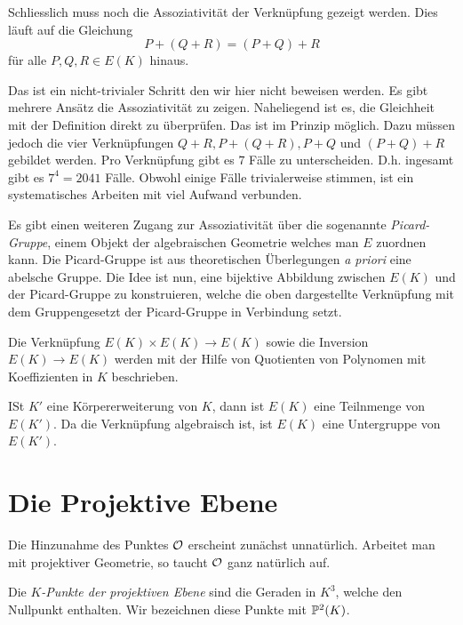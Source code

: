 Schliesslich muss noch die Assoziativität der Verknüpfung gezeigt
werden. Dies läuft auf die Gleichung
$$
P + (Q + R) = (P+Q)+R$$
für alle $P,Q,R\in E(K)$ hinaus.

Das ist ein nicht-trivialer Schritt den wir hier nicht beweisen
werden. Es gibt mehrere Ansätz die Assoziativität zu zeigen.
Naheliegend ist es, die Gleichheit mit der Definition direkt zu
überprüfen. Das ist im Prinzip möglich. Dazu müssen jedoch die vier
Verknüpfungen $Q+R, P+(Q+R), P+Q$ und $(P+Q)+R$ gebildet werden.
Pro Verknüpfung gibt es $7$ Fälle zu unterscheiden. D.h. ingesamt gibt
es $7^4= 2041$ Fälle. Obwohl einige Fälle trivialerweise stimmen, ist
ein systematisches Arbeiten mit viel Aufwand verbunden.


Es gibt einen weiteren Zugang zur Assoziativität über die sogenannte
 \emph{Picard-Gruppe}, einem  Objekt der algebraischen Geometrie
welches man $E$ zuordnen kann. Die Picard-Gruppe ist aus theoretischen
Überlegungen \textit{a priori} eine abelsche Gruppe. Die Idee ist nun, eine
bijektive Abbildung zwischen $E(K)$ und der Picard-Gruppe zu
konstruieren, welche die oben dargestellte Verknüpfung mit dem
Gruppengesetzt der Picard-Gruppe in Verbindung setzt.


\begin{bemerkung}
  Die Verknüpfung $E(K)\times
  E(K)\rightarrow E(K)$ sowie die Inversion $E(K)\rightarrow E(K)$
  werden mit der Hilfe von 
  Quotienten von Polynomen mit Koeffizienten in $K$ beschrieben.

  ISt $K'$ eine Körpererweiterung von $K$, dann ist $E(K)$ eine
  Teilnmenge von $E(K')$. Da die Verknüpfung algebraisch ist, ist
  $E(K)$ eine Untergruppe von $E(K')$.
\end{bemerkung}

\section{Die Projektive Ebene}
\label{sec:projektiv}

Die Hinzunahme des Punktes ${\mathcal O}$ erscheint zunächst unnatürlich.
Arbeitet man mit projektiver Geometrie, so taucht ${\mathcal O}$ ganz natürlich
auf.

\begin{definition}
  Die \emph{$K$-Punkte der projektiven Ebene} sind die Geraden in $K^3$,
  welche den Nullpunkt enthalten. Wir bezeichnen diese Punkte mit
  ${\mathbb{P}}^2(K)$. 
\end{definition}

